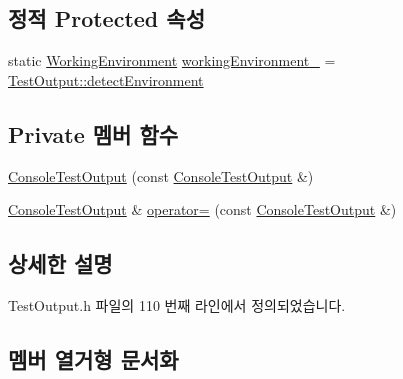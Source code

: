 \subsection*{정적 Protected 속성}
\begin{DoxyCompactItemize}
\item 
static \hyperlink{class_test_output_a0541851f863713454486a9fb3080f766}{Working\+Environment} \hyperlink{class_test_output_a8b622cfce4b95599cd31b61a777d68ef}{working\+Environment\+\_\+} = \hyperlink{class_test_output_a0541851f863713454486a9fb3080f766a3f11f791db94db142e33c3c75442ed10}{Test\+Output\+::detect\+Environment}
\end{DoxyCompactItemize}
\subsection*{Private 멤버 함수}
\begin{DoxyCompactItemize}
\item 
\hyperlink{class_console_test_output_a04c80a401941f21464d69fe15473403f}{Console\+Test\+Output} (const \hyperlink{class_console_test_output}{Console\+Test\+Output} \&)
\item 
\hyperlink{class_console_test_output}{Console\+Test\+Output} \& \hyperlink{class_console_test_output_a425ed62b11c467839cb1b7b7b92c4584}{operator=} (const \hyperlink{class_console_test_output}{Console\+Test\+Output} \&)
\end{DoxyCompactItemize}


\subsection{상세한 설명}


Test\+Output.\+h 파일의 110 번째 라인에서 정의되었습니다.



\subsection{멤버 열거형 문서화}
